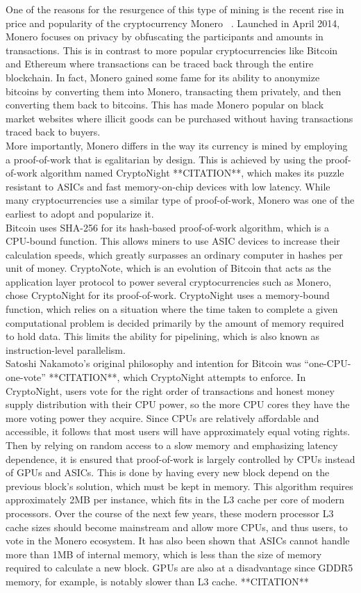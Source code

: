 One of the reasons for the resurgence of this type of mining is the recent rise in price and popularity of the cryptocurrency Monero ~\cite{monero}. Launched in April 2014, Monero focuses on privacy by obfuscating the participants and amounts in transactions. This is in contrast to more popular cryptocurrencies like Bitcoin and Ethereum where transactions can be traced back through the entire blockchain. In fact, Monero gained some fame for its ability to anonymize bitcoins by converting them into Monero, transacting them privately, and then converting them back to bitcoins. This has made Monero popular on black market websites where illicit goods can be purchased without having transactions traced back to buyers. 
\\
More importantly, Monero differs in the way its currency is mined by employing a proof-of-work that is egalitarian by design. This is achieved by using the proof-of-work algorithm named CryptoNight **CITATION**, which makes its puzzle resistant to ASICs and fast memory-on-chip devices with low latency. While many cryptocurrencies use a similar type of proof-of-work, Monero was one of the earliest to adopt and popularize it. 
\\
Bitcoin uses SHA-256 for its hash-based proof-of-work algorithm, which is a CPU-bound function. This allows miners to use ASIC devices to increase their calculation speeds, which greatly surpasses an ordinary computer in hashes per unit of money. CryptoNote, which is an evolution of Bitcoin that acts as the application layer protocol to power several cryptocurrencies such as Monero, chose CryptoNight for its proof-of-work. CryptoNight uses a memory-bound function, which relies on a situation where the time taken to complete a given computational problem is decided primarily by the amount of memory required to hold data. This limits the ability for pipelining, which is also known as instruction-level parallelism.  
\\
Satoshi Nakamoto’s original philosophy and intention for Bitcoin was “one-CPU-one-vote” **CITATION**, which CryptoNight attempts to enforce. In CryptoNight, users vote for the right order of transactions and honest money supply distribution with their CPU power, so the more CPU cores they have the more voting power they acquire. Since CPUs are relatively affordable and accessible, it follows that most users will have approximately equal voting rights. Then by relying on random access to a slow memory and emphasizing latency dependence, it is ensured that proof-of-work is largely controlled by CPUs instead of GPUs and ASICs. This is done by having every new block depend on the previous block’s solution, which must be kept in memory. This algorithm requires approximately 2MB per instance, which fits in the L3 cache per core of modern processors. Over the course of the next few years, these modern processor L3 cache sizes should become mainstream and allow more CPUs, and thus users, to vote in the Monero ecosystem. It has also been shown that ASICs cannot handle more than 1MB of internal memory, which is less than the size of memory required to calculate a new block. GPUs are also at a disadvantage since GDDR5 memory, for example, is notably slower than L3 cache. **CITATION** 
\\

